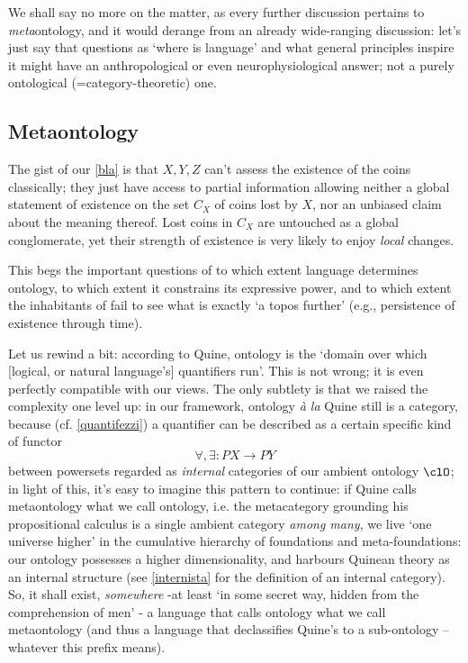 We shall say no more on the matter, as every further discussion pertains to \emph{meta}ontology, and it would derange from an already wide-ranging discussion: let's just say that questions as `where is language' and what general principles inspire it might have an anthropological or even neurophysiological answer; not a purely ontological (=category-theoretic) one.

\subsection{Metaontology} \label{metaon}
The gist of our \autoref{bla} is that $X,Y,Z$ can't assess the existence of the coins classically; they just have access to partial information allowing neither a global statement of existence on the set $C_X$ of coins lost by $X$, nor an unbiased claim about the meaning thereof. Lost coins in $C_X$ are untouched as a global conglomerate, yet their strength of existence is very likely to enjoy \emph{local} changes.

This begs the important questions of to which extent language determines ontology, to which extent it constrains its expressive power, and to which extent the inhabitants of \tlon fail to see what is exactly `a topos further' (e.g., persistence of existence through time).

Let us rewind a bit: according to Quine, ontology is the `domain over which [logical, or natural language's] quantifiers run'. This is not wrong; it is even perfectly compatible with our views. The only subtlety is that we raised the complexity one level up: in our framework, ontology \emph{à la} Quine still is a category, because (cf. \autoref{quantifezzi}) a quantifier can be described as a certain specific kind of functor
\[\forall,\exists : PX \to PY\]
between powersets regarded as \emph{internal} categories of our ambient ontology $\clO$; in light of this, it's easy to imagine this pattern to continue: if Quine calls metaontology what we call ontology, i.e. the metacategory grounding his propositional calculus is a single ambient category \emph{among many}, we live `one universe higher' in the cumulative hierarchy of foundations and meta-foundations: our ontology possesses a higher dimensionality, and harbours Quinean theory as an internal structure (see \autoref{internista} for the definition of an internal category). So, it shall exist, \emph{somewhere} -at least `in some secret way, hidden from the comprehension of men' \cite{Borges1963}- a language that calls ontology what we call metaontology (and thus a language that declassifies Quine's to a sub-ontology --whatever this prefix means).

